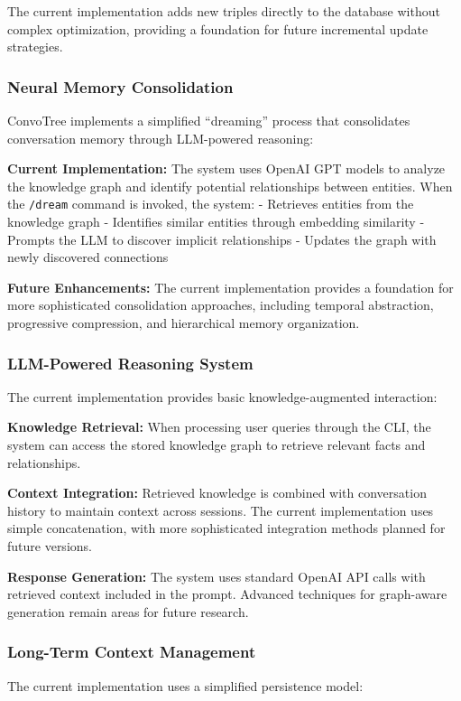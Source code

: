 \documentclass[11pt]{article}
\begin{document}
The current implementation adds new triples directly to the database without complex optimization, providing a foundation for future incremental update strategies.

\subsubsection{Neural Memory Consolidation}
ConvoTree implements a simplified ``dreaming'' process that consolidates conversation memory through LLM-powered reasoning:

\textbf{Current Implementation:} The system uses OpenAI GPT models to analyze the knowledge graph and identify potential relationships between entities. When the \texttt{/dream} command is invoked, the system:
- Retrieves entities from the knowledge graph
- Identifies similar entities through embedding similarity
- Prompts the LLM to discover implicit relationships
- Updates the graph with newly discovered connections

\textbf{Future Enhancements:} The current implementation provides a foundation for more sophisticated consolidation approaches, including temporal abstraction, progressive compression, and hierarchical memory organization.

\subsubsection{LLM-Powered Reasoning System}
The current implementation provides basic knowledge-augmented interaction:

\textbf{Knowledge Retrieval:} When processing user queries through the CLI, the system can access the stored knowledge graph to retrieve relevant facts and relationships.

\textbf{Context Integration:} Retrieved knowledge is combined with conversation history to maintain context across sessions. The current implementation uses simple concatenation, with more sophisticated integration methods planned for future versions.

\textbf{Response Generation:} The system uses standard OpenAI API calls with retrieved context included in the prompt. Advanced techniques for graph-aware generation remain areas for future research.

\subsubsection{Long-Term Context Management}
The current implementation uses a simplified persistence model:
\end{document}
